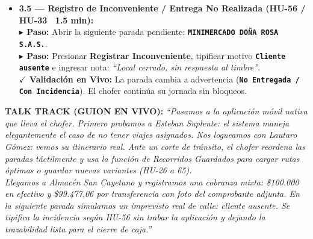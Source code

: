 \documentclass[a4paper,9pt]{article}
\newcommand{\stepact}[1]{\textbf{$\blacktriangleright$ Paso:} #1}
\newcommand{\valact}[1]{\textbf{$\checkmark$ Validación en Vivo:} #1}
\newcommand{\codeb}[1]{\texttt{\bfseries #1}}
\begin{document}
\begin{tcolorbox}[cardframe, top=3pt, bottom=3pt, left=6pt, right=6pt]
{\begin{itemize}[leftmargin=11pt, itemsep=4pt]
\item \textbf{3.5 — Registro de Inconveniente / Entrega No Realizada (HU-56 / HU-33 \textbar\ 1.5 min):} \\
\stepact{Abrir la siguiente parada pendiente: \codeb{MINIMERCADO DOÑA ROSA S.A.S.}.} \\
\stepact{Presionar \textbf{Registrar Inconveniente}, tipificar motivo \codeb{Cliente ausente} e ingresar nota: \textit{``Local cerrado, sin respuesta al timbre''}.} \\
\valact{La parada cambia a advertencia (\codeb{No Entregada / Con Incidencia}). El chofer continúa su jornada sin bloqueos.}

\end{itemize}
}

\vspace{1pt}
\begin{tcolorbox}[talktrackcard]
{\scriptsize\textbf{TALK TRACK (GUION EN VIVO):}} {\scriptsize\itshape
``Pasamos a la aplicación móvil nativa que lleva el chofer. Primero probamos a Esteban Suplente: el sistema maneja elegantemente el caso de no tener viajes asignados. Nos logueamos con Lautaro Gómez: vemos su itinerario real. Ante un corte de tránsito, el chofer reordena las paradas táctilmente y usa la función de Recorridos Guardados para cargar rutas óptimas o guardar nuevas variantes (HU-26 a 65).\\
Llegamos a Almacén San Cayetano y registramos una cobranza mixta: \$100.000 en efectivo y \$99.477,06 por transferencia con foto del comprobante adjunta. En la siguiente parada simulamos un imprevisto real de calle: cliente ausente. Se tipifica la incidencia según HU-56 sin trabar la aplicación y dejando la trazabilidad lista para el cierre de caja.''}
\end{tcolorbox}
\end{tcolorbox}

\vspace{-4pt}
\end{document}
